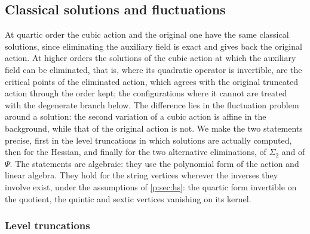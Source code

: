 \subsection{Classical solutions and fluctuations}
\label{p:sec:solutions}

At quartic order the cubic action and the original one have the same classical solutions, since eliminating the auxiliary field is exact and gives back the original action.
At higher orders the solutions of the cubic action at which the auxiliary field can be eliminated, that is, where its quadratic operator is invertible, are the critical points of the eliminated action, which agrees with the original truncated action through the order kept; the configurations where it cannot are treated with the degenerate branch below.
The difference lies in the fluctuation problem around a solution: the second variation of a cubic action is affine in the background, while that of the original action is not.
We make the two statements precise, first in the level truncations in which solutions are actually computed, then for the Hessian, and finally for the two alternative eliminations, of $\Sigma_2$ and of $\Psi$.
The statements are algebraic: they use the polynomial form of the action and linear algebra.
They hold for the string vertices wherever the inverses they involve exist, under the assumptions of \cref{p:sec:hs}: the quartic form invertible on the quotient, the quintic and sextic vertices vanishing on its kernel.

\subsubsection{Level truncations}
\label{p:sec:sol:level-truncations}


